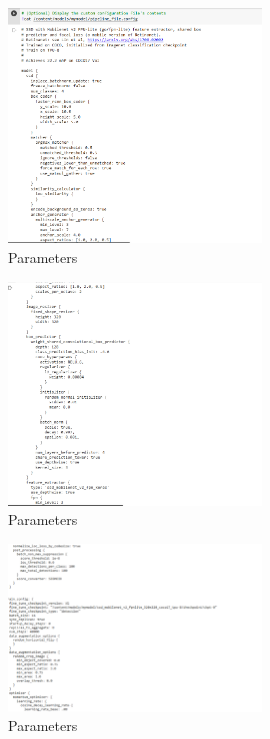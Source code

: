 \begin{figure}[!htbp]
    \centering
    \includegraphics[width=0.6\textwidth]{Imgs/trainconfig.png}
    \caption{\label{fig:train_config}Parameters }
\end{figure}
\begin{figure}[!htbp]
    \centering
    \includegraphics[width=0.6\textwidth]{Imgs/trainconfig2.png}
    \caption{\label{fig:train_config}Parameters }
\end{figure}
\begin{figure}[!htbp]
    \centering
    \includegraphics[width=0.6\textwidth]{Imgs/training_parameters.png}
    \caption{\label{fig:train_params}Parameters }
\end{figure}

